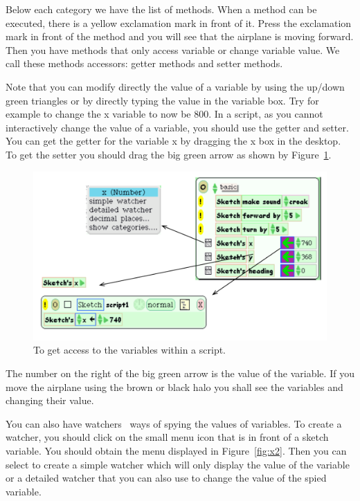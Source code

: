 Below each category we have the list of methods. 
When a method can be executed, there is a yellow exclamation mark in front of it. Press the exclamation mark in front of the method  and you will see that the airplane is moving forward.
Then you have methods that only access variable or change variable value. We call these methods accessors: getter methods and setter methods. 

Note that you can modify directly the value of a variable by using the 
up/down green triangles or by directly typing the value in the variable box. Try for example to change the x variable to now be 800. 
In a script, as you cannot interactively change the value of a variable, you should use the getter and setter. You can get the getter for the variable x by dragging the x box in the desktop. To get the setter you should drag the big green arrow as shown by Figure~\ref{fig:x1}. 

\begin{figure}[h]
\begin{center}\includegraphics[width=12cm]{fromAccessorToScript} \end{center} \caption{To get access to the variables within a script. \label{fig:x1}}
\end{figure}

The number on the right of the big green arrow is the value of the variable. If you move the airplane using the brown or black halo you shall see the variables  and  changing their value.

You can also have watchers \ie\ ways of spying the values of variables. To create a watcher, you should click on the small menu icon that is in front of a sketch variable. You should obtain the menu displayed in Figure~\ref{fig:x2}. Then you can select to create a simple watcher which will only display the value of the variable or a detailed watcher that you can also use to change the value of the spied variable.

